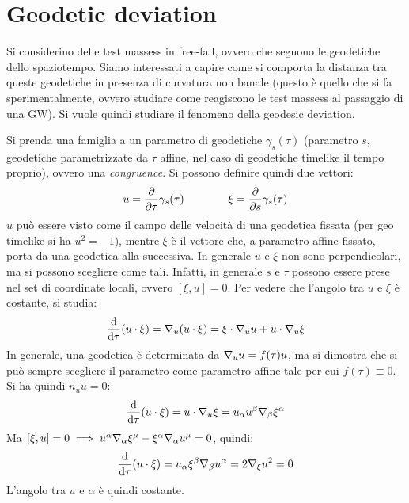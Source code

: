 \section{Geodetic deviation}

Si considerino delle test massess in free-fall, ovvero che seguono le geodetiche dello spaziotempo. Siamo interessati a capire come si comporta la distanza tra queste geodetiche in presenza di curvatura non banale (questo è quello che si fa sperimentalmente, ovvero studiare come reagiscono le test massess al passaggio di una GW). Si vuole quindi studiare il fenomeno della geodesic deviation.

Si prenda una famiglia a un parametro di geodetiche $ \gamma_s(\tau) $ (parametro $ s $, geodetiche parametrizzate da $ \tau $ affine, nel caso di geodetiche timelike il tempo proprio), ovvero una \emph{congruence}. Si possono definire quindi due vettori:
\begin{equation}
  u = \frac{\partial}{\partial \tau} \gamma_s(\tau)
  \qquad \qquad
  \xi = \frac{\partial}{\partial s} \gamma_s(\tau)
\end{equation}
$ u $ può essere visto come il campo delle velocità di una geodetica fissata (per geo timelike si ha $ u^2 = -1 $), mentre $ \xi $ è il vettore che, a parametro affine fissato, porta da una geodetica alla successiva. In generale $ u $ e $ \xi $ non sono perpendicolari, ma si possono scegliere come tali. Infatti, in generale $ s $ e $ \tau $ possono essere prese nel set di coordinate locali, ovvero $ [\xi , u] = 0 $. Per vedere che l'angolo tra $ u $ e $ \xi $ è costante, si studia:
\begin{equation*}
  \frac{\mathrm{d}}{\mathrm{d} \tau} (u \cdot \xi) = \nabla_u (u \cdot \xi) = \xi \cdot \nabla_u u + u \cdot \nabla_u \xi
\end{equation*}
In generale, una geodetica è determinata da $ \nabla_u u = f(\tau) u $, ma si dimostra che si può sempre scegliere il parametro come parametro affine tale per cui $ f(\tau) \equiv 0 $. Si ha quindi $ n_u u = 0 $:
\begin{equation*}
  \frac{\mathrm{d}}{\mathrm{d} \tau} (u \cdot \xi) = u \cdot \nabla_u \xi = u_\alpha u^\beta \nabla_\beta \xi^\alpha
\end{equation*}
Ma $ [\xi , u] = 0 \implies u^\alpha \nabla_\alpha \xi^\mu - \xi^\alpha \nabla_\alpha u^\mu = 0 $, quindi:
\begin{equation*}
  \frac{\mathrm{d}}{\mathrm{d} \tau} (u \cdot \xi) = u_\alpha \xi^\beta \nabla_\beta u^\alpha = 2 \nabla_\xi u^2 = 0
\end{equation*}
L'angolo tra $ u $ e $ \alpha $ è quindi costante.

